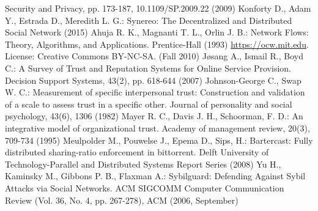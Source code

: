 \begin{thebibliography}{40}
   Security and Privacy, pp. 173-187, 10.1109/SP.2009.22 (2009)
   Konforty D., Adam Y., Estrada D., Meredith L. G.: Synereo: The Decentralized and Distributed Social Network (2015)
   Ahuja R. K., Magnanti T. L., Orlin J. B.: Network Flows: Theory, Algorithms, and Applications. Prentice-Hall (1993)
   \url{https://ocw.mit.edu}. License: Creative Commons BY-NC-SA. (Fall 2010)
   J\o{}sang A., Ismail R., Boyd C.: A Survey of Trust and Reputation Systems for Online Service Provision. Decision
   Support Systems, 43(2), pp. 618-644 (2007)
   Johnson-George C., Swap W. C.: Measurement of specific interpersonal trust: Construction and validation of a scale to
   assess trust in a specific other. Journal of personality and social psychology, 43(6), 1306 (1982)
   Mayer R. C., Davis J. H., Schoorman, F. D.: An integrative model of organizational trust. Academy of management review,
   20(3), 709-734 (1995)
   Meulpolder M., Pouwelse J., Epema D., Sips, H.: Bartercast: Fully distributed sharing-ratio enforcement in bittorrent.
   Delft University of Technology-Parallel and Distributed Systems Report Series (2008)
   Yu H., Kaminsky M., Gibbons P. B., Flaxman A.: Sybilguard: Defending Against Sybil Attacks via Social Networks. ACM
   SIGCOMM Computer Communication Review (Vol. 36, No. 4, pp. 267-278), ACM (2006, September)
\end{thebibliography}

